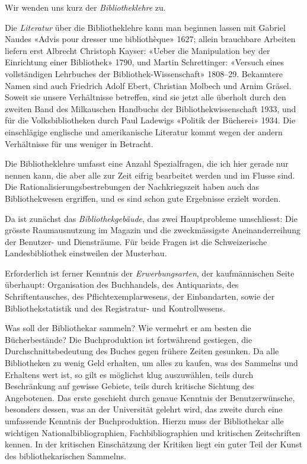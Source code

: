\documentclass[a4paper,
fontsize=11pt,
oneside,
numbers=noperiodatend,
parskip=half-,
bibliography=totoc,
final
]{scrartcl}
\begin{document}
Wir wenden uns kurz der \emph{Bibliotheklehre} zu.

Die \emph{Literatur} über die Bibliotheklehre kann man beginnen lassen
mit Gabriel Naudes «Advis pour dresser une bibliothèque» 1627; allein
brauchbare Arbeiten liefern erst Albrecht Christoph Kayser: «Ueber die
Manipulation bey der Einrichtung einer Bibliothek» 1790, und Martin
Schrettinger: «Versuch eines vollständigen Lehrbuches der
Bibliothek-Wissenschaft» 1808--29. Bekanntere Namen sind auch Friedrich
Adolf Ebert, Christian Molbech und Arnim Gräsel. Soweit sie unsere
Verhältnisse betreffen, sind sie jetzt alle überholt durch den zweiten
Band des Milkauschen Handbuchs der Bibliothekwissenschaft 1933, und für
die Volksbibliotheken durch Paul Ladewigs «Politik der Bücherei» 1934.
Die einschlägige englische und amerikanische Literatur kommt wegen der
andern Verhältnisse für uns weniger in Betracht.

Die Bibliotheklehre umfasst eine Anzahl Spezialfragen, die ich hier
gerade nur nennen kann, die aber alle zur Zeit eifrig bearbeitet werden
und im Flusse sind. Die Rationalisierungsbestrebungen der Nachkriegszeit
haben auch das Bibliothekwesen ergriffen, und es sind schon gute
Ergebnisse erzielt worden.

Da ist zunächst das \emph{Bibliothekgebäude}, das zwei Hauptprobleme
umschliesst: Die grösste Raumausnutzung im Magazin und die
zweckmässigste Aneinanderreihung der Benutzer- und Dienst\-räume. Für
beide Fragen ist die Schweizerische Landesbibliothek einstweilen der
Musterbau.

Erforderlich ist ferner Kenntnis der \emph{Erwerbungsarten}, der
kaufmännischen Seite überhaupt: Organisation des Buchhandels, des
Antiquariats, des Schriftentausches, des Pflichtexemplarwesens, der
Einbandarten, sowie der Bibliothekstatistik und des Registratur- und
Kontrollwesens.

Was soll der Bibliothekar sammeln? Wie vermehrt er am besten die
Bücherbestände? Die Buchproduktion ist fortwährend gestiegen, die
Durchschnittsbedeutung des Buches gegen frühere Zeiten gesunken. Da alle
Bibliotheken zu wenig Geld erhalten, um alles zu kaufen, was des
Sammelns und Erhaltens wert ist, so gilt es möglichst klug auszuwählen,
teils durch Beschränkung auf gewisse Gebiete, teils durch kritische
Sichtung des Angebotenen. Das erste geschieht durch genaue Kenntnis der
Benutzerwünsche, besonders dessen, was an der Universität gelehrt wird,
das zweite durch eine umfassende Kenntnis der Buchproduktion. Hierzu
muss der Bibliothekar alle wichtigen Nationalbibliographien,
Fachbibliographien und kritischen Zeitschriften kennen. In der
kritischen Einschätzung der Kritiken liegt ein guter Teil der Kunst des
bibliothekarischen Sammelns.
\end{document}
